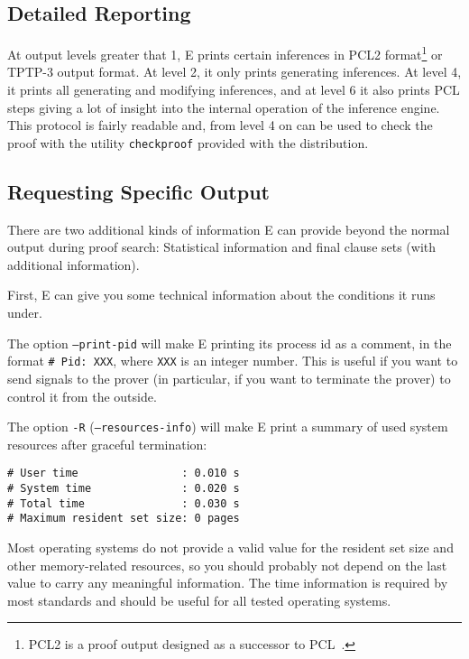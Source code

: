 \documentclass{article}
\begin{document}
\subsection{Detailed Reporting}
\label{sec:output:lots}

At output levels greater that 1, E prints certain inferences in PCL2
format\footnote{PCL2 is a proof output designed as a successor to
  PCL~\cite{DS94a,DS94b,DS96a}.} or TPTP-3 output format.  At level 2,
it only prints generating inferences. At level 4, it prints all
generating and modifying inferences, and at level 6 it also prints PCL
steps giving a lot of insight into the internal operation of the
inference engine.  This protocol is fairly readable and, from level 4
on can be used to check the proof with the utility \texttt{checkproof}
provided with the distribution.


\subsection{Requesting Specific Output}
\label{sec:output:results}

There are two additional kinds of information E can provide beyond the
normal output during proof search: Statistical information and final
clause sets (with additional information).

First, E can give you some technical information about the conditions
it runs under. 

The option \texttt{--print-pid} will make E printing its process id as
a comment, in the format \texttt{\# Pid: XXX}, where \texttt{XXX} is an
integer number. This is useful if you want to send signals to the
prover (in particular, if you want to terminate the prover) to control
it from the outside.

The option \texttt{-R} (\texttt{--resources-info}) will make E print a
summary of used system resources after graceful termination:

\begin{verbatim}
# User time                : 0.010 s
# System time              : 0.020 s
# Total time               : 0.030 s
# Maximum resident set size: 0 pages
\end{verbatim}

Most operating systems do not provide a valid value for the resident
set size and other memory-related resources, so you should probably
not depend on the last value to carry any meaningful information. The
time information is required by most standards and should be useful
for all tested operating systems.
\end{document}
